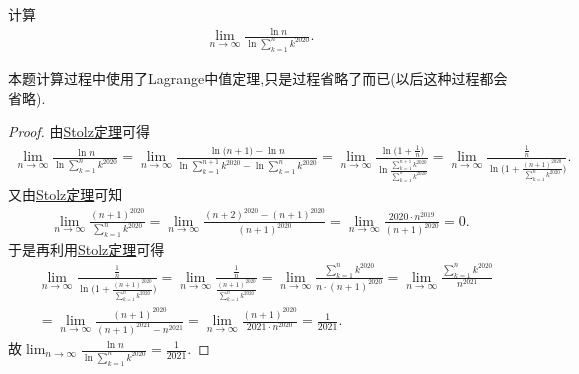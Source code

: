 \documentclass[../../main.tex]{subfiles}%
\begin{document}
\begin{example}
计算
\begin{align*}
\lim_{n \to \infty} \frac{\ln n}{\ln \sum\limits_{k = 1}^{n} k^{2020}}.
\end{align*}
\end{example}
\begin{note}
本题计算过程中使用了Lagrange中值定理,只是过程省略了而已(以后这种过程都会省略).
\end{note}
\begin{proof}

由\hyperref[theorem:Stolz定理]{Stolz定理}可得
\begin{align*}
\lim_{n \to \infty} \frac{\ln n}{\ln \sum\limits_{k = 1}^{n} k^{2020}}=\lim_{n\rightarrow \infty} \frac{\ln\mathrm{(}n+1)-\ln n}{\ln \sum\limits_{k=1}^{n+1}{k^{2020}}-\ln \sum\limits_{k=1}^n{k^{2020}}}=\lim_{n\rightarrow \infty} \frac{\ln\mathrm{(}1+\frac{1}{n})}{\ln \frac{\sum\limits_{k=1}^{n+1}{k^{2020}}}{\sum\limits_{k=1}^n{k^{2020}}}}=\lim_{n\rightarrow \infty} \frac{\frac{1}{n}}{\ln\mathrm{(}1+\frac{(n+1)^{2020}}{\sum\limits_{k=1}^n{k^{2020}}})}.
\end{align*}
又由\hyperref[theorem:Stolz定理]{Stolz定理}可知
\begin{align*}
\lim_{n\rightarrow \infty} \frac{(n+1)^{2020}}{\sum\limits_{k=1}^n{k^{2020}}}=\lim_{n\rightarrow \infty} \frac{(n+2)^{2020}-(n+1)^{2020}}{(n+1)^{2020}}=\lim_{n\rightarrow \infty} \frac{2020\cdot n^{2019}}{(n+1)^{2020}}=0.
\end{align*}
于是再利用\hyperref[theorem:Stolz定理]{Stolz定理}可得
\begin{align*}
&\lim_{n\rightarrow \infty} \frac{\frac{1}{n}}{\ln\mathrm{(}1+\frac{(n+1)^{2020}}{\sum\limits_{k=1}^n{k^{2020}}})}=\lim_{n\rightarrow \infty} \frac{\frac{1}{n}}{\frac{(n+1)^{2020}}{\sum\limits_{k=1}^n{k^{2020}}}}=\lim_{n\rightarrow \infty} \frac{\sum\limits_{k=1}^n{k^{2020}}}{n\cdot (n+1)^{2020}}=\lim_{n\rightarrow \infty} \frac{\sum\limits_{k=1}^n{k^{2020}}}{n^{2021}}  \\
&=\lim_{n\rightarrow \infty} \frac{(n+1)^{2020}}{(n+1)^{2021}-n^{2021}}=\lim_{n\rightarrow \infty} \frac{(n+1)^{2020}}{2021\cdot n^{2020}}=\frac{1}{2021}.
\end{align*}
故$\lim_{n \to \infty} \frac{\ln n}{\ln \sum\limits_{k = 1}^{n} k^{2020}}=\frac{1}{2021}$.

\end{proof}
\end{document}

